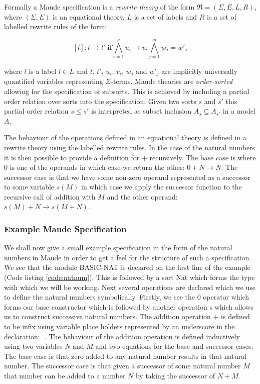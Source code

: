 Formally a Maude specification is a \emph{rewrite theory} of the form $\mathfrak{R}=(\Sigma,E,L,R)$, where  $(\Sigma, E)$ is an equational theory, $L$ is a set of labels and $R$ is a set of labelled rewrite rules of the form:

$$ [l] : t \to t' \ \mathbf{if} \bigwedge^{n}_{i = 1} u_i \to v_i \bigwedge^{m}_{j = 1} w_j = w'_j $$

where $l$ is a label $l \in L$ and $t$, $t'$, $u_i$, $v_i$, $w_j$ and $w'_j$ are implicitly universally quantified variables representing $\Sigma$-terms. Maude theories are \emph{order-sorted} allowing for the specification of subsorts. This is achieved by including a partial order relation over sorts into the specification. Given two sorts $s$ and $s'$ this partial order relation $s \leq s'$ is interpreted as subset inclusion $A_s \subseteq A_{s'}$ in a model $A$.

The behaviour of the operations defined in an equational theory is defined in a rewrite theory using the labelled rewrite rules. In the case of the natural numbers it is then possible to provide a definition for $+$ recursively. The base case is where $0$ is one of the operands in which case we return the other: $0 + N \to N$. The successor case is that we have some non-zero operand represented as a successor to some variable $s(M)$ in which case we apply the successor function to the recursive call of addition with $M$ and the other operand: $s(M) + N \to s(M + N)$. 
 

\subsubsection{Example Maude Specification}
We shall now give a small example specification in the form of the natural numbers in Maude in order to get a feel for the structure of such a specification. We see that the module BASIC-NAT is declared on the first line of the example (Code listing \ref{code:natnum}). This is followed by a sort Nat which forms the type with which we will be working. Next several operations are declared which we use to define the natural numbers symbolically. Firstly, we see the $0$ operator which forms our base constructor which is followed by another operation s which allows us to construct successive natural numbers. The addition operation $+$ is defined to be infix using variable place holders represented by an underscore in the declaration:  $\_$. The behaviour of the addition operation is defined inductively using two variables $N$ and $M$ and two equations for the base and successor cases. The base case is that zero added to any natural number results in that natural number. The successor case is that given a successor of some natural number $M$ that number can be added to a number $N$ by taking the successor of $N+M$.


